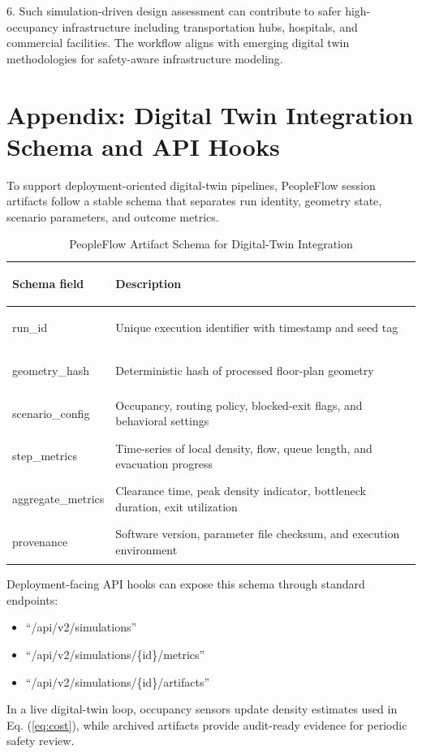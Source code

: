 \documentclass[utf8]{FrontiersinHarvard}
\begin{document}
6. Such simulation-driven design assessment can contribute to safer high-occupancy infrastructure including transportation hubs, hospitals, and commercial facilities. The workflow aligns with emerging digital twin methodologies for safety-aware infrastructure modeling.

\section{Appendix: Digital Twin Integration Schema and API Hooks}
To support deployment-oriented digital-twin pipelines, PeopleFlow session artifacts follow a stable schema that separates run identity, geometry state, scenario parameters, and outcome metrics.

\begin{table}[!htbp]
\centering
\caption{PeopleFlow Artifact Schema for Digital-Twin Integration}
\label{tab:dt_schema}
{\footnotesize
\setlength{\tabcolsep}{4pt}
\renewcommand{\arraystretch}{1.05}
\begin{tabular}{>{\bfseries\raggedright\arraybackslash}L{3.30cm} L{8.70cm}}
\toprule
Schema field & Description \\
\midrule
run\_id & Unique execution identifier with timestamp and seed tag \\
geometry\_hash & Deterministic hash of processed floor-plan geometry \\
scenario\_config & Occupancy, routing policy, blocked-exit flags, and behavioral settings \\
step\_metrics & Time-series of local density, flow, queue length, and evacuation progress \\
aggregate\_metrics & Clearance time, peak density indicator, bottleneck duration, exit utilization \\
provenance & Software version, parameter file checksum, and execution environment \\
\bottomrule
\end{tabular}
}
\end{table}

Deployment-facing API hooks can expose this schema through standard endpoints:
\begin{itemize}
    \item ``/api/v2/simulations''
    \item ``/api/v2/simulations/\{id\}/metrics''
    \item ``/api/v2/simulations/\{id\}/artifacts''
\end{itemize}
In a live digital-twin loop, occupancy sensors update density estimates used in Eq. (\ref{eq:cost}), while archived artifacts provide audit-ready evidence for periodic safety review.
\end{document}

